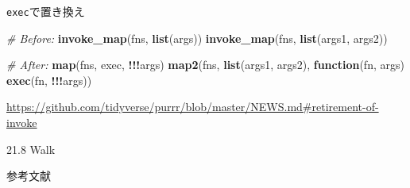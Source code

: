 \documentclass[ignorenonframetext,]{beamer}
\newenvironment{Shaded}{\begin{snugshade}}{\end{snugshade}}
\newcommand{\KeywordTok}[1]{\textcolor[rgb]{0.13,0.29,0.53}{\textbf{#1}}}
\newcommand{\CommentTok}[1]{\textcolor[rgb]{0.56,0.35,0.01}{\textit{#1}}}
\newcommand{\ControlFlowTok}[1]{\textcolor[rgb]{0.13,0.29,0.53}{\textbf{#1}}}
\newcommand{\OperatorTok}[1]{\textcolor[rgb]{0.81,0.36,0.00}{\textbf{#1}}}
\newcommand{\NormalTok}[1]{#1}
\begin{document}
\begin{frame}[fragile]{\texttt{exec}で置き換え}

\begin{Shaded}
\begin{Highlighting}[]
\CommentTok{# Before:}
\KeywordTok{invoke_map}\NormalTok{(fns, }\KeywordTok{list}\NormalTok{(args))}
\KeywordTok{invoke_map}\NormalTok{(fns, }\KeywordTok{list}\NormalTok{(args1, args2))}

\CommentTok{# After:}
\KeywordTok{map}\NormalTok{(fns, exec, }\OperatorTok{!!!}\NormalTok{args)}
\KeywordTok{map2}\NormalTok{(fns, }\KeywordTok{list}\NormalTok{(args1, args2), }\ControlFlowTok{function}\NormalTok{(fn, args) }\KeywordTok{exec}\NormalTok{(fn, }\OperatorTok{!!!}\NormalTok{args))}
\end{Highlighting}
\end{Shaded}

\url{https://github.com/tidyverse/purrr/blob/master/NEWS.md\#retirement-of-invoke}

\end{frame}

\begin{frame}{21.8 Walk}

\end{frame}

\begin{frame}{参考文献}

\end{frame}
\end{document}
